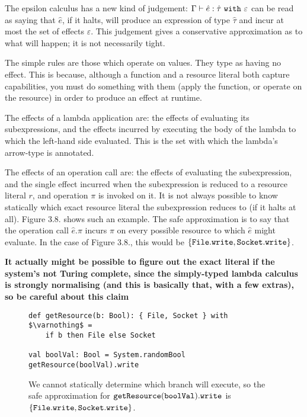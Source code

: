 \noindent
The epsilon calculus has a new kind of judgement: $\Gamma \vdash \hat e: \hat \tau~\mathtt{with}~ \varepsilon$ can be read as saying that $\hat e$, if it halts, will produce an expression of type $\hat \tau$ and incur at most the set of effects $\varepsilon$. This judgement gives a conservative approximation as to what will happen; it is not necessarily tight.

The simple rules are those which operate on values. They type as having no effect. This is because, although a function and a resource literal both capture capabilities, you must do something with them (apply the function, or operate on the resource) in order to produce an effect at runtime.

The effects of a lambda application are: the effects of evaluating its subexpressions, and the effects incurred by executing the body of the lambda to which the left-hand side evaluated. This is the set with which the lambda's arrow-type is annotated.

The effects of an operation call are: the effects of evaluating the subexpression, and the single effect incurred when the subexpression is reduced to a resource literal $r$, and operation $\pi$ is invoked on it. It is not always possible to know statically which exact resource literal the subexpression reduces to (if it halts at all). Figure 3.8. shows such an example. The safe approximation is to say that the operation call $\hat e.\pi$ incurs $\pi$ on every possible resource to which $\hat e$ might evaluate. In the case of Figure 3.8., this would be $\mathtt{\{ File.write, Socket.write \}}$.

\textbf{It actually might be possible to figure out the exact literal if the system's not Turing complete, since the simply-typed lambda calculus is strongly normalising (and this is basically that, with a few extras), so be careful about this claim} \\

\begin{figure}[h]

\begin{lstlisting}
def getResource(b: Bool): { File, Socket } with $\varnothing$ =
    if b then File else Socket
 
val boolVal: Bool = System.randomBool
getResource(boolVal).write

\end{lstlisting}
\vspace{-7pt}
\caption{We cannot statically determine which branch will execute, so the safe approximation for $\mathtt{getResource(boolVal).write}$ is $\{ \mathtt{File.write, Socket.write} \}$.}
\label{This is the label.}
\end{figure}

